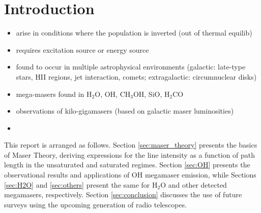 \section{Introduction}
\label{sec:intro}

\begin{itemize}
\item arise in conditions where the population is inverted (out of thermal equilib)
\item requires excitation source or energy source
\item found to occur in multiple astrophysical environments (galactic: late-type stars, HII regions, jet interaction, comets; extragalactic: circumnuclear disks)
\item mega-masers found in H$_2$O, OH, CH$_3$OH, SiO, H$_2$CO
\item observations of kilo-gigamasers (based on galactic maser luminosities)
\item 
\end{itemize}

This report is arranged as follows. Section \ref{sec:maser_theory} presents the basics of Maser Theory, deriving expressions for the line intensity as a function of path length in the unsaturated and saturated regimes. Section \ref{sec:OH} presents the observational results and applications of OH megamaser emission, while Sections \ref{sec:H2O} and \ref{sec:others} present the same for H$_2$O and other detected megamasers, respectively. Section \ref{sec:conclusion} discusses the use of future surveys using the upcoming generation of radio telescopes.